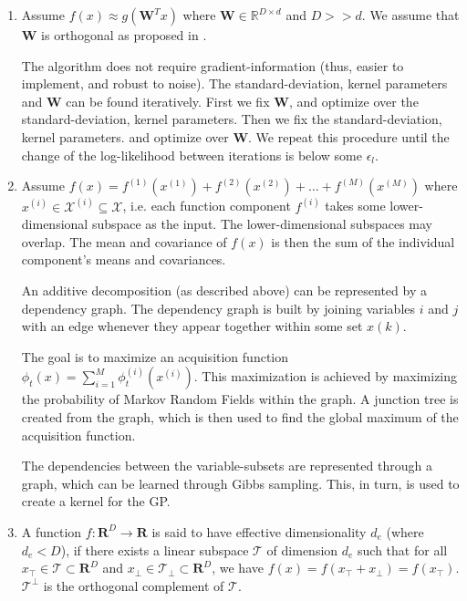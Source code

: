 \begin{enumerate}
\item \cite{Tripathy}
Assume $f(x) \approx g( \mathbf{W}^T x)$ where $ \mathbf{W} \in \mathbb{R}^{D \times d} $ and $D >> d$.
We assume that $ \mathbf{W} $ is orthogonal as proposed in \cite{Tripathy}.

The algorithm does not require gradient-information (thus, easier to implement, and robust to noise).
The standard-deviation, kernel parameters and  $ \mathbf{W} $ can be found iteratively.
First we fix $ \mathbf{W} $, and optimize over the standard-deviation, kernel parameters.
Then we fix the standard-deviation, kernel parameters. and optimize over $ \mathbf{W} $.
We repeat this procedure until the change of the log-likelihood between iterations is below some $ \epsilon_l $.

\item \cite{Rolland}
Assume $f(x) = f^{(1)}( x^{(1)} )  + f^{(2)}( x^{(2)} ) + \ldots + f^{(M)}( x^{(M)} )$ where $ x^{(i)} \in \mathcal{X}^{(i)} \subseteq \mathcal{X}$, i.e. each function component  $f^{(i)}$ takes some lower-dimensional subspace as the input.
The lower-dimensional subspaces may overlap.
The mean and covariance of $f(x)$ is then the sum of the individual component's means and covariances.

An additive decomposition (as described above) can be represented by a dependency graph. The dependency graph is built by joining variables $i$ and $j$ with an edge whenever they appear together within some set $x(k)$. 

The goal is to maximize an acquisition function $ \phi_t(x) = \sum_{i=1}^M \phi_t^{(i)} ( x^{(i)} )$. 
This maximization is achieved by maximizing the probability of Markov Random Fields within the graph.
A junction tree is created from the graph, which is then used to find the global maximum of the acquisition function.

The dependencies between the variable-subsets are represented through a graph, which can be learned through Gibbs sampling.
This, in turn, is used to create a kernel for the GP.

\item \cite{Wang}
A function $f : \mathbf{R}^D \rightarrow \mathbf{R}$ is said to have effective dimensionality $d_e$ (where $d_e < D$), if there exists a linear subspace $\mathcal{T}$ of dimension $d_e$ such that for all $ x_\top \in \mathcal{T} \subset \mathbf{R}^D $ and $x_\perp \in \mathcal{T_\perp} \subset \mathbf{R}^D $, we have $ f(x) = f(x_\top +x_\perp ) = f(x_\top)$.
$\mathcal{T^\perp}$ is the orthogonal complement of $\mathcal{T}$.


\end{enumerate}
